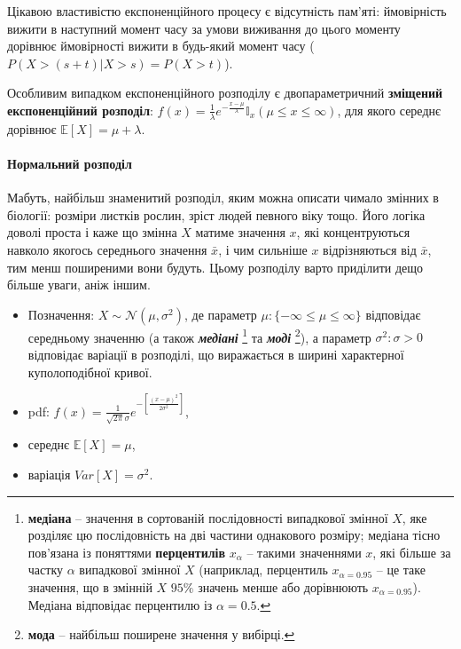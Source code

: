 \documentclass[
  11pt,
]{book}
\begin{document}
Цікавою властивістю експоненційного процесу є відсутність пам'яті:
ймовірність вижити в наступний момент часу за умови виживання до цього
моменту дорівнює ймовірності вижити в будь-який момент часу
(\(P(X > (s+t)|X > s) = P(X > t)\)).

Особливим випадком експоненційного розподілу є двопараметричний
\textbf{зміщений експоненційний розподіл}:
\(f(x) = \frac{1}{\lambda} e^{-\frac{x - \mu}{\lambda}} \mathbb{I}_x (\mu \leq x \leq \infty)\),
для якого середнє дорівнює \(\mathbb{E}[X] = \mu + \lambda\).

\paragraph{Нормальний
розподіл}\label{ux43dux43eux440ux43cux430ux43bux44cux43dux438ux439-ux440ux43eux437ux43fux43eux434ux456ux43b}

Мабуть, найбільш знаменитий розподіл, яким можна описати чимало змінних
в біології: розміри листків рослин, зріст людей певного віку тощо. Його
логіка доволі проста і каже що змінна \(X\) матиме значення \(x\), які
концентруються навколо якогось середнього значення \(\bar{x}\), і чим
сильніше \(x\) відрізняються від \(\bar{x}\), тим менш поширеними вони
будуть. Цьому розподілу варто приділити дещо більше уваги, аніж іншим.

\begin{itemize}
\item
  Позначення: \(X \sim \mathcal{N}(\mu, \sigma^2)\), де параметр
  \(\mu: \{-\infty \leq \mu \leq \infty\}\) відповідає середньому
  значенню (а також \textbf{\emph{медіані}} \footnote{\textbf{медіана}
    -- значення в сортованій послідовності випадкової змінної \(X\), яке
    розділяє цю послідовність на дві частини однакового розміру; медіана
    тісно пов'язана із поняттями \textbf{перцентилів} \(x_{\alpha}\) --
    такими значеннями \(x\), які більше за частку \(\alpha\) випадкової
    змінної \(X\) (наприклад, перцентиль \(x_{\alpha = 0.95}\) -- це
    таке значення, що в змінній \(X\) \(95 \%\) значень менше або
    дорівнюють \(x_{\alpha = 0.95}\)). Медіана відповідає перцентилю із
    \(\alpha = 0.5\).} та \textbf{\emph{моді}} \footnote{\textbf{мода}
    -- найбільш поширене значення у вибірці.}), а параметр
  \(\sigma^2: \sigma > 0\) відповідає варіації в розподілі, що
  виражається в ширині характерної куполоподібної кривої.
\item
  pdf:
  \(f(x) = \frac{1}{\sqrt{2 \pi} \sigma} e^{-\left[ \frac{(x - \mu)^2}{2 \sigma^2} \right]}\),
\item
  середнє \(\mathbb{E} [X] = \mu\),
\item
  варіація \(Var[X] = \sigma^2\).
\end{itemize}
\end{document}
